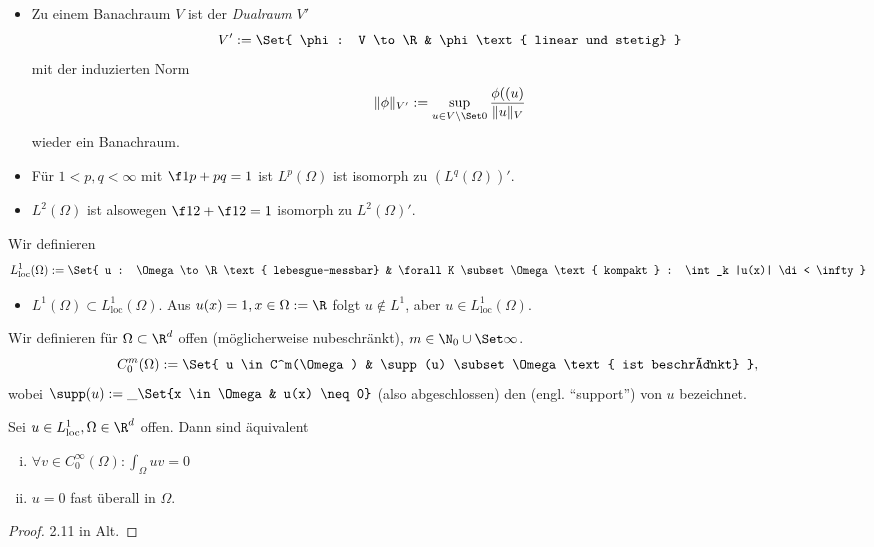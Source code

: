 \begin{df}[$L^p$-Räume]
\begin{note}
\begin{itemize}
			\item
				Zu einem Banachraum $V$ ist der \emph{Dualraum} $V'$
				\[
					V' := \Set{ \phi: V \to \R & \phi \text{ linear und stetig} }
				\]
				mit der induzierten Norm
				\[
					\|\phi\|_{V'} := \sup_{u\in V\setminus \Set 0} \frac{\phi((u)}{\|u\|_V}
				\]
				wieder ein Banachraum.
			\item
				Für $1 < p,q < \infty$ mit $\f 1p + pq = 1$ ist $L^p(\Omega)$ ist isomorph zu $(L^q(\Omega))'$.
			\item
				$L^2(\Omega)$ ist alsowegen $\f 12 + \f 12 = 1$ isomorph zu $L^2(\Omega)'$.
		\end{itemize}
	\end{note}
\end{df}

\begin{df} \label{1.5}
	Wir definieren
	\[
		L^1_{\text{loc}}(\Omega) :=
		\Set{ u : \Omega \to \R \text{ lebesgue-messbar} & \forall  K \subset \Omega \text{ kompakt } : \int_k |u(x)| \di < \infty }
	\]
\end{df}

\begin{ex*}
	\begin{itemize}
		\item
			$L^1(\Omega) \subset L^1_{\text{loc}}(\Omega)$.
			Aus $u(x) = 1, x \in \Omega := \R$ folgt $u \not\in L^1$, aber $u \in L^1_{\text{loc}}(\Omega)$.
	\end{itemize}
\end{ex*}

\begin{df} \label{1.6}
	Wir definieren für $\Omega \subset \R^d$ offen (möglicherweise nubeschränkt), $m \in \N_0 \cup \Set \infty$.
	\[
		C_0^m(\Omega)
		:= \Set{ u \in C^m(\Omega) & \supp(u) \subset \Omega \text{ ist beschränkt} },
	\]
	wobei $\supp(u) := \_{\Set{x \in \Omega & u(x) \neq 0}}$ (also abgeschlossen) den  (engl. “support”) von $u$ bezeichnet.
\end{df}

\begin{st} \label{1.7}
	Sei $u \in L^1_{\text{loc}}, \Omega \in \R^d$ offen. Dann sind äquivalent
	\begin{enumerate}[i)]
		\item
			$\forall v \in C_0^\infty(\Omega) : \int_\Omega uv = 0$
		\item
			$u = 0$ fast überall in $\Omega$.			
	\end{enumerate}
	\begin{proof}
		2.11 in Alt.
	\end{proof}
\end{st}

